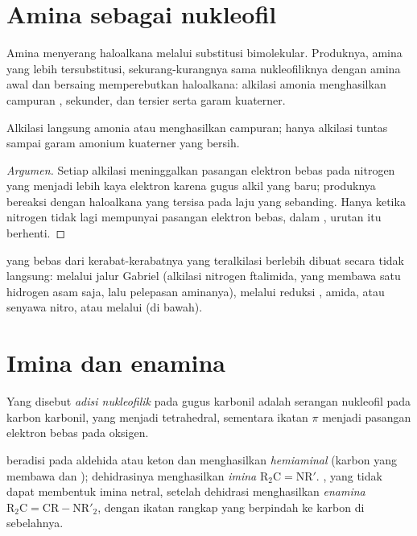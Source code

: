\section{Amina sebagai nukleofil}

Amina menyerang haloalkana melalui substitusi bimolekular. Produknya, amina
yang lebih tersubstitusi, sekurang-kurangnya sama nukleofiliknya dengan
amina awal dan bersaing memperebutkan haloalkana: alkilasi amonia
menghasilkan campuran , sekunder, dan tersier serta garam
kuaterner.

\begin{proposition}[Polialkilasi]\label{prop:b2:amines:polyalkylation}
Alkilasi langsung amonia atau  menghasilkan campuran; hanya
alkilasi tuntas sampai garam amonium kuaterner yang bersih.
\end{proposition}

\begin{proof}[Argumen]
Setiap alkilasi meninggalkan pasangan elektron bebas pada nitrogen yang
menjadi lebih kaya elektron karena gugus alkil yang baru; produknya bereaksi
dengan haloalkana yang tersisa pada laju yang sebanding. Hanya ketika
nitrogen tidak lagi mempunyai pasangan elektron bebas, dalam ,
urutan itu berhenti.
\end{proof}

 yang bebas dari kerabat-kerabatnya yang teralkilasi berlebih
dibuat secara tidak langsung: melalui jalur Gabriel (alkilasi nitrogen
ftalimida, yang membawa satu hidrogen asam saja, lalu pelepasan aminanya),
melalui reduksi , amida, atau senyawa nitro, atau melalui  (di bawah).

\section{Imina dan enamina}

\begin{definition}\label{def:b2:amines:nucleophilic-addition}
Yang disebut \emph{adisi nukleofilik} pada gugus
karbonil adalah serangan nukleofil pada karbon karbonil, yang menjadi
tetrahedral, sementara ikatan $\pi$  menjadi
pasangan elektron bebas pada oksigen.
\end{definition}

\begin{definition}\label{def:b2:amines:imine}
 beradisi pada aldehida atau keton dan menghasilkan
\emph{hemiaminal} (karbon yang membawa  dan );
dehidrasinya menghasilkan \emph{imina}
$\mathrm{R_2C{=}NR'}$. , yang tidak dapat membentuk imina netral, setelah
dehidrasi menghasilkan
\emph{enamina} $\mathrm{R_2C{=}CR{-}NR'_2}$, dengan ikatan
rangkap yang berpindah ke karbon di sebelahnya.
\end{definition}

